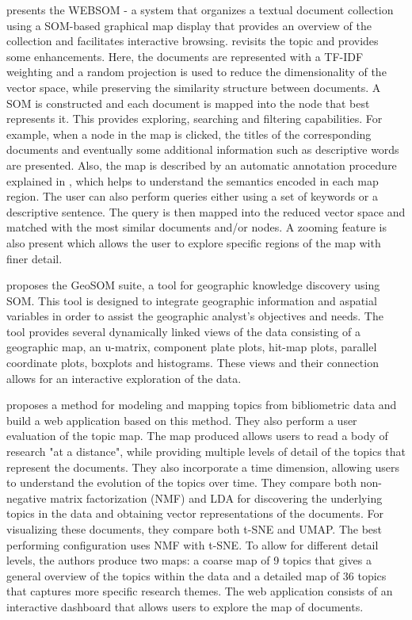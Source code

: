 \documentclass[a4paper]{article}
\begin{document}
\citet{kaski1998} presents the WEBSOM - a system that organizes a textual document collection using a SOM-based graphical map display that provides an overview of the collection and facilitates interactive browsing. \citet{kohonen2013} revisits the topic and provides some enhancements. Here, the documents are represented with a TF-IDF weighting and a random projection is used to reduce the dimensionality of the vector space, while preserving the similarity structure between documents. A SOM is constructed and each document is mapped into the node that best represents it. This provides exploring, searching and filtering capabilities. For example, when a node in the map is clicked, the titles of the corresponding documents and eventually some additional information such as descriptive words are presented. Also, the map is described by an automatic annotation procedure explained in \citet{lagus1999}, which helps to understand the semantics encoded in each map region. The user can also perform queries either using a set of keywords or a descriptive sentence. The query is then mapped into the reduced vector space and matched with the most similar documents and/or nodes. A zooming feature is also present which allows the user to explore specific regions of the map with finer detail.

\citet{henriques2012} proposes the GeoSOM suite, a tool for geographic knowledge discovery using SOM. This tool is designed to integrate geographic information and aspatial variables in order to assist the geographic analyst's objectives and needs. The tool provides several dynamically linked views of the data consisting of a geographic map, an u-matrix, component plate plots, hit-map plots, parallel coordinate plots, boxplots and histograms. These views and their connection allows for an interactive exploration of the data.

\citep{lafia2021a} proposes a method for modeling and mapping topics from bibliometric data and build a web application based on this method. They also perform a user evaluation of the topic map. The map produced allows users to read a body of research "at a distance", while providing multiple levels of detail of the topics that represent the documents. They also incorporate a time dimension, allowing users to understand the evolution of the topics over time. They compare both non-negative matrix factorization (NMF) \citep{lee1999} and LDA for discovering the underlying topics in the data and obtaining vector representations of the documents. For visualizing these documents, they compare both t-SNE and UMAP. The best performing configuration uses NMF with t-SNE. To allow for different detail levels, the authors produce two maps: a coarse map of 9 topics that gives a general overview of the topics within the data and a detailed map of 36 topics that captures more specific research themes. The web application consists of an interactive dashboard that allows users to explore the map of documents.
\end{document}
